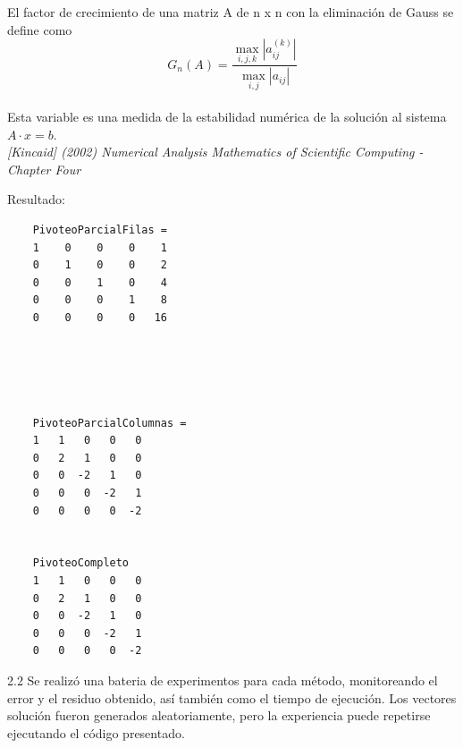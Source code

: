 \documentclass{article}
\begin{document}
El factor de crecimiento de una matriz A de n x n con la eliminación de Gauss se define como 
\[
G_n(A) = \dfrac{\max_{i, j, k}{|a_{ij}^{(k)}|}}{\max_{i, j}{|a_{ij}|}}
\]\\
Esta variable es una medida de la estabilidad numérica de la solución al sistema $A \cdot x = b$.\\

\textit{[Kincaid] (2002) Numerical Analysis Mathematics of Scientific Computing - Chapter Four \\}

Resultado:

\begin{lstlisting}
    PivoteoParcialFilas =
    1    0    0    0    1
    0    1    0    0    2
    0    0    1    0    4
    0    0    0    1    8
    0    0    0    0   16

    ㅤ
    ㅤ
    ㅤ
    
    PivoteoParcialColumnas =
    1   1   0   0   0
    0   2   1   0   0
    0   0  -2   1   0
    0   0   0  -2   1
    0   0   0   0  -2


    PivoteoCompleto
    1   1   0   0   0
    0   2   1   0   0
    0   0  -2   1   0
    0   0   0  -2   1
    0   0   0   0  -2

\end{lstlisting}

2.2 
Se realizó una bateria de experimentos para cada método, monitoreando el error y el residuo obtenido, así también como el tiempo de ejecución. Los vectores solución fueron generados aleatoriamente, pero la experiencia puede repetirse ejecutando el código presentado.
\end{document}
